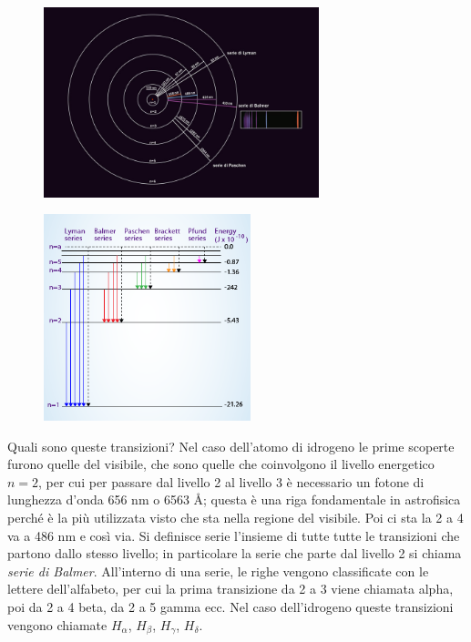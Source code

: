 \begin{minipage}{0.5\textwidth}
   \begin{figure}[H]
      \centering
      \includegraphics[width=8cm]{immagini/serie_balmer_1.png}
   \end{figure}
\end{minipage}
\begin{minipage}{0.5\textwidth}
   \begin{figure}[H]
      \centering
      \includegraphics[width=6cm]{immagini/serie_balmer_2.png}
   \end{figure}
\end{minipage}

\vspace{0.3cm}Quali sono queste transizioni? Nel caso dell'atomo di idrogeno le prime scoperte furono quelle del visibile, che sono quelle che coinvolgono il livello energetico $n=2$, per cui per passare dal livello 2 al livello 3 è necessario un fotone di lunghezza d'onda 656 nm o 6563 \AA; questa è una riga fondamentale in astrofisica perché è la più utilizzata visto che sta nella regione del visibile. Poi ci sta la 2 a 4 va a 486 nm e così via. Si definisce serie l'insieme di tutte tutte le transizioni che partono dallo stesso livello; in particolare la serie che parte dal livello 2 si chiama \textit{serie di Balmer}. All'interno di una serie, le righe vengono classificate con le lettere dell'alfabeto, per cui la prima transizione da 2 a 3 viene chiamata alpha, poi da 2 a 4 beta, da 2 a 5 gamma ecc.
Nel caso dell'idrogeno queste transizioni vengono chiamate $H_\alpha$, $H_\beta$, $H_\gamma$, $H_\delta$.

